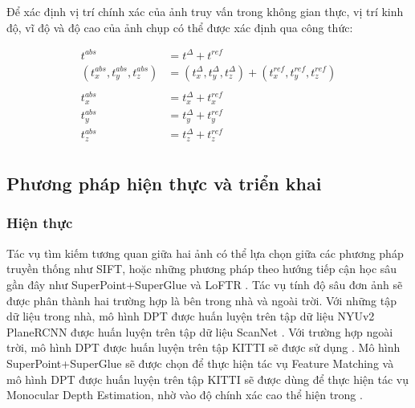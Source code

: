 Để xác định vị trí chính xác của ảnh truy vấn trong không gian thực, vị trí kinh độ, vĩ độ và độ cao của ảnh chụp có thể được xác định qua công thức:

$$
  \begin{aligned}
    t^{abs}                         & = t^{\Delta} + t^{ref}                                                       \\
    (t^{abs}_x,t^{abs}_y,t^{abs}_z) & = (t^{\Delta}_x,t^{\Delta}_y,t^{\Delta}_z) + (t^{ref}_x,t^{ref}_y,t^{ref}_z) \\ \\
    t^{abs}_x                       & = t^{\Delta}_x + t^{ref}_x                                                   \\
    t^{abs}_y                       & = t^{\Delta}_y + t^{ref}_y                                                   \\
    t^{abs}_z                       & = t^{\Delta}_z + t^{ref}_z                                                   \\
  \end{aligned}
$$

\subsection{Phương pháp hiện thực và triển khai}
\subsubsection{Hiện thực}
Tác vụ tìm kiếm tương quan giữa hai ảnh có thể lựa chọn giữa các phương pháp truyền thống như SIFT, hoặc những phương pháp theo hướng tiếp cận học sâu gần đây như SuperPoint+SuperGlue \cite{sarlin2020superglue} và LoFTR \cite{sun2021loftr}. Tác vụ tính độ sâu đơn ảnh sẽ được phân thành hai trường hợp là bên trong nhà và ngoài trời. Với những tập dữ liệu trong nhà, mô hình DPT \cite{ranftl2021vision} được huấn luyện trên tập dữ liệu NYUv2 \cite{silberman2012indoor} PlaneRCNN \cite{liu2019planercnn} được huấn luyện trên tập dữ liệu ScanNet \cite{dai2017scannet}. Với trường hợp ngoài trời, mô hình DPT \cite{ranftl2021vision} được huấn luyện trên tập KITTI sẽ được sử dụng \cite{geiger2012we}. Mô hình SuperPoint+SuperGlue sẽ được chọn để thực hiện tác vụ Feature Matching và mô hình DPT được huấn luyện trên tập KITTI sẽ được dùng để thực hiện tác vụ Monocular Depth Estimation, nhờ vào độ chính xác cao thể hiện trong \cite{arnold2022mapfree}.

